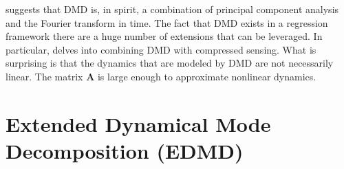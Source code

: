  suggests that DMD is, in spirit, a combination of principal component analysis and the Fourier transform in time. The fact that DMD exists in a regression framework there are a huge number of extensions that can be leveraged. In particular,  delves into combining DMD with compressed sensing. What is surprising is that the dynamics that are modeled by DMD are not necessarily linear. The matrix $\mathbf{A}$ is large enough to approximate nonlinear dynamics.


\section{Extended Dynamical Mode Decomposition (EDMD)}
\label{sec:edmd}

